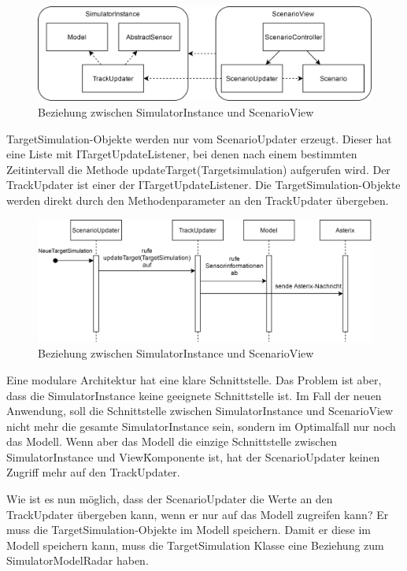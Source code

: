 \begin{figure}[h!]
    \centering
    \includegraphics[width=1\textwidth]{content/assets/Kapitel3/ScenarioViewRelations.png}
    \caption{Beziehung zwischen SimulatorInstance und ScenarioView}
    \label{figure:scenarioview}
\end{figure}

TargetSimulation-Objekte werden nur vom ScenarioUpdater erzeugt. Dieser hat eine Liste mit ITargetUpdateListener, bei denen nach einem bestimmten Zeitintervall die Methode updateTarget(Targetsimulation) aufgerufen wird. Der TrackUpdater ist einer der ITargetUpdateListener. Die TargetSimulation-Objekte werden direkt durch den Methodenparameter an den TrackUpdater übergeben.

\begin{figure}[h]
    \centering
    \includegraphics[width=1\textwidth]{content/assets/Kapitel3/TargetSimulationUsecase.png}
    \caption{Beziehung zwischen SimulatorInstance und ScenarioView}
    \label{figure:x}
\end{figure}

Eine modulare Architektur hat eine klare Schnittstelle. Das Problem ist aber, dass die SimulatorInstance keine geeignete Schnittstelle ist. Im Fall der neuen Anwendung, soll die Schnittstelle zwischen SimulatorInstance und ScenarioView nicht mehr die gesamte SimulatorInstance sein, sondern im Optimalfall nur noch das Modell. Wenn aber das Modell die einzige Schnittstelle zwischen SimulatorInstance und View\=Komponente ist, hat der ScenarioUpdater keinen Zugriff mehr auf den TrackUpdater.

Wie ist es nun möglich, dass der ScenarioUpdater die Werte an den TrackUpdater übergeben kann, wenn er nur auf das Modell zugreifen kann? Er muss die TargetSimulation-Objekte im Modell speichern. Damit er diese im Modell speichern kann, muss die TargetSimulation Klasse eine Beziehung zum SimulatorModelRadar haben.


